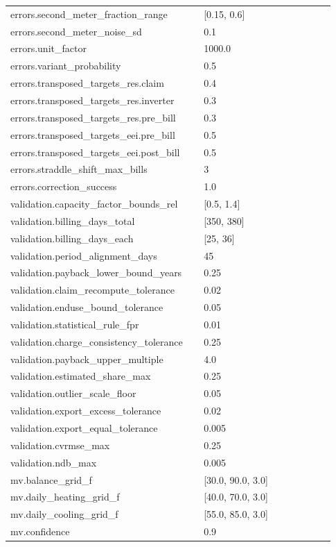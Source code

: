 \begin{longtable}{p{0.55\linewidth}p{0.38\linewidth}}
errors.second\_meter\_fraction\_range & [0.15, 0.6] \\
errors.second\_meter\_noise\_sd & 0.1 \\
errors.unit\_factor & 1000.0 \\
errors.variant\_probability & 0.5 \\
errors.transposed\_targets\_res.claim & 0.4 \\
errors.transposed\_targets\_res.inverter & 0.3 \\
errors.transposed\_targets\_res.pre\_bill & 0.3 \\
errors.transposed\_targets\_eei.pre\_bill & 0.5 \\
errors.transposed\_targets\_eei.post\_bill & 0.5 \\
errors.straddle\_shift\_max\_bills & 3 \\
errors.correction\_success & 1.0 \\
validation.capacity\_factor\_bounds\_rel & [0.5, 1.4] \\
validation.billing\_days\_total & [350, 380] \\
validation.billing\_days\_each & [25, 36] \\
validation.period\_alignment\_days & 45 \\
validation.payback\_lower\_bound\_years & 0.25 \\
validation.claim\_recompute\_tolerance & 0.02 \\
validation.enduse\_bound\_tolerance & 0.05 \\
validation.statistical\_rule\_fpr & 0.01 \\
validation.charge\_consistency\_tolerance & 0.25 \\
validation.payback\_upper\_multiple & 4.0 \\
validation.estimated\_share\_max & 0.25 \\
validation.outlier\_scale\_floor & 0.05 \\
validation.export\_excess\_tolerance & 0.02 \\
validation.export\_equal\_tolerance & 0.005 \\
validation.cvrmse\_max & 0.25 \\
validation.ndb\_max & 0.005 \\
mv.balance\_grid\_f & [30.0, 90.0, 3.0] \\
mv.daily\_heating\_grid\_f & [40.0, 70.0, 3.0] \\
mv.daily\_cooling\_grid\_f & [55.0, 85.0, 3.0] \\
mv.confidence & 0.9 \\

\end{longtable}
